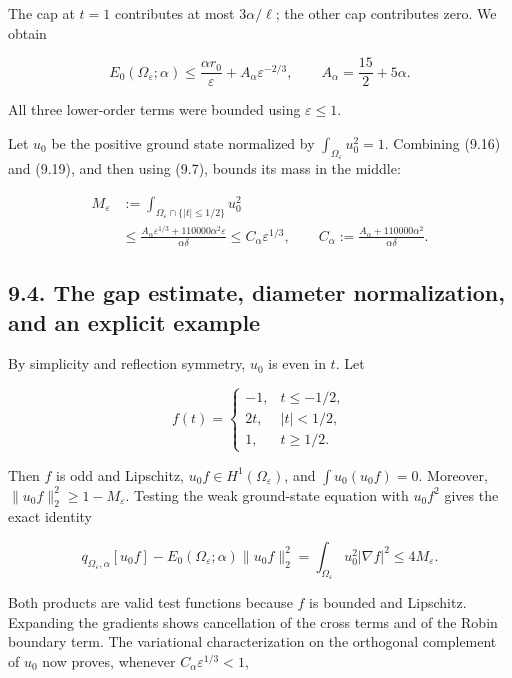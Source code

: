 \documentclass[11pt]{article}
\begin{document}
The cap at \(t=1\) contributes at most \(3\alpha/\ell\); the other cap
contributes zero. We obtain

\[
E_0(\Omega_\varepsilon;\alpha)
\le\frac{\alpha r_0}{\varepsilon}
 +A_\alpha\varepsilon^{-2/3},
\qquad A_\alpha=\frac{15}{2}+5\alpha.
\tag{9.19}
\]

All three lower-order terms were bounded using \(\varepsilon\le1\).

Let \(u_0\) be the positive ground state normalized by
\(\int_{\Omega_\varepsilon}u_0^2=1\). Combining (9.16) and (9.19), and
then using (9.7), bounds its mass in the middle:

\[
\begin{aligned}
M_\varepsilon&:=\int_{\Omega_\varepsilon\cap\{|t|\le1/2\}}u_0^2\\
&\le\frac{A_\alpha\varepsilon^{1/3}+110000\alpha^2\varepsilon}
 {\alpha\delta}
\le C_\alpha\varepsilon^{1/3},\qquad
C_\alpha:=\frac{A_\alpha+110000\alpha^2}{\alpha\delta}.
\end{aligned}
\tag{9.20}
\]

\subsection{9.4. The gap estimate, diameter normalization, and an
explicit
example}\label{the-gap-estimate-diameter-normalization-and-an-explicit-example}

By simplicity and reflection symmetry, \(u_0\) is even in \(t\). Let

\[
f(t)=\begin{cases}
-1,&t\le-1/2,\\
2t,&|t|<1/2,\\
1,&t\ge1/2.
\end{cases}
\tag{9.21}
\]

Then \(f\) is odd and Lipschitz, \(u_0f\in H^1(\Omega_\varepsilon)\),
and \(\int u_0(u_0f)=0\). Moreover, \(\|u_0f\|_2^2\ge1-M_\varepsilon\).
Testing the weak ground-state equation with \(u_0f^2\) gives the exact
identity

\[
q_{\Omega_\varepsilon,\alpha}[u_0f]
 -E_0(\Omega_\varepsilon;\alpha)\|u_0f\|_2^2
 =\int_{\Omega_\varepsilon}u_0^2|\nabla f|^2
 \le4M_\varepsilon.
\tag{9.22}
\]

Both products are valid test functions because \(f\) is bounded and
Lipschitz. Expanding the gradients shows cancellation of the cross terms
and of the Robin boundary term. The variational characterization on the
orthogonal complement of \(u_0\) now proves, whenever
\(C_\alpha\varepsilon^{1/3}<1\),
\end{document}
